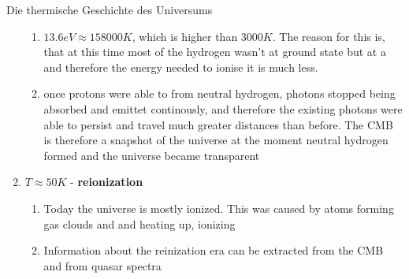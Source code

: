 \documentclass{alex_hü}
\begin{document}
\begin{mybox}{Die thermische Geschichte des Universums}
\begin{enumerate}[label=\arabic*)]
		\begin{enumerate}
			\item \( 13.6 \unit{eV} \approx 158 000 \unit{K} \), which is higher than \( 3000 \unit{K} \). The reason for this is, that at this time most of the hydrogen wasn't at ground state but at a and therefore the energy needed to ionise it is much less.
			\item once protons were able to from neutral hydrogen, photons stopped being absorbed and emittet continously, and therefore the existing photons were able to persist and travel much greater distances than before. The CMB is therefore a snapshot of the universe at the moment neutral hydrogen formed and the universe became transparent
		\end{enumerate}
	\tcbline
	\item \( T \approx 50 \unit{K} \) - \textbf{reionization}
		\begin{enumerate}
			\item Today the universe is mostly ionized. This was caused by atoms forming gas clouds and and heating up, ionizing 
			\item Information about the reinization era can be extracted from the CMB and from quasar spectra
		\end{enumerate}
	\end{enumerate}
\end{mybox}
\end{document}
